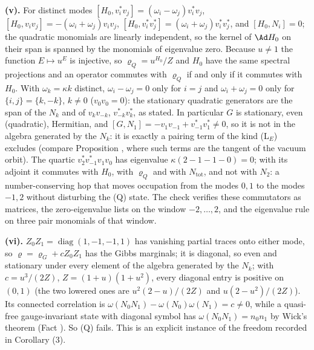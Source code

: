 \textbf{(v).} For distinct modes $[H_0, v_i^{*}v_j] = (\omega_i - \omega_j)v_i^{*}v_j$, $[H_0, v_iv_j] = -(\omega_i + \omega_j)v_iv_j$, $[H_0, v_i^{*}v_j^{*}] = (\omega_i + \omega_j)v_i^{*}v_j^{*}$, and $[H_0, N_i] = 0$; the quadratic monomials are linearly independent, so the kernel of $\Ad H_0$ on their span is spanned by the monomials of eigenvalue zero. Because $u \neq 1$ the function $E \mapsto u^{E}$ is injective, so $\varrho_Q = u^{H_0}/Z$ and $H_0$ have the same spectral projections and an operator commutes with $\varrho_Q$ if and only if it commutes with $H_0$. With $\omega_k = \kappa k$ distinct, $\omega_i - \omega_j = 0$ only for $i = j$ and $\omega_i + \omega_j = 0$ only for $\{i, j\} = \{k, -k\}$, $k \neq 0$ ($v_0v_0 = 0$): the stationary quadratic generators are the span of the $N_k$ and of $v_kv_{-k}$, $v_{-k}^{*}v_k^{*}$, as stated. In particular $G$ is stationary, even (quadratic), Hermitian, and $[G, N_1] = -v_1v_{-1} + v_{-1}^{*}v_1^{*} \neq 0$, so it is not in the algebra generated by the $N_k$: it is exactly a pairing term of the kind (L$_E$) excludes (compare Proposition , where such terms are the tangent of the vacuum orbit). The quartic $v_2^{*}v_{-1}^{*}v_1v_0$ has eigenvalue $\kappa(2 - 1 - 1 - 0) = 0$; with its adjoint it commutes with $H_0$, with $\varrho_Q$ and with $N_{\mathrm{tot}}$, and not with $N_2$: a number-conserving hop that moves occupation from the modes $0, 1$ to the modes $-1, 2$ without disturbing the (Q) state. The check verifies these commutators as matrices, the zero-eigenvalue lists on the window $-2, \ldots, 2$, and the eigenvalue rule on three pair monomials of that window.

\textbf{(vi).} $Z_0Z_1 = \operatorname{diag}(1, -1, -1, 1)$ has vanishing partial traces onto either mode, so $\varrho = \varrho_G + cZ_0Z_1$ has the Gibbs marginals; it is diagonal, so even and stationary under every element of the algebra generated by the $N_k$; with $c = u^{3}/(2Z)$, $Z = (1 + u)(1 + u^{2})$, every diagonal entry is positive on $(0, 1)$ (the two lowered ones are $u^{2}(2 - u)/(2Z)$ and $u(2 - u^{2})/(2Z)$). Its connected correlation is $\omega(N_0N_1) - \omega(N_0)\omega(N_1) = c \neq 0$, while a quasi-free gauge-invariant state with diagonal symbol has $\omega(N_0N_1) = n_0n_1$ by Wick's theorem (Fact ). So (Q) fails. This is an explicit instance of the freedom recorded in Corollary (3).

